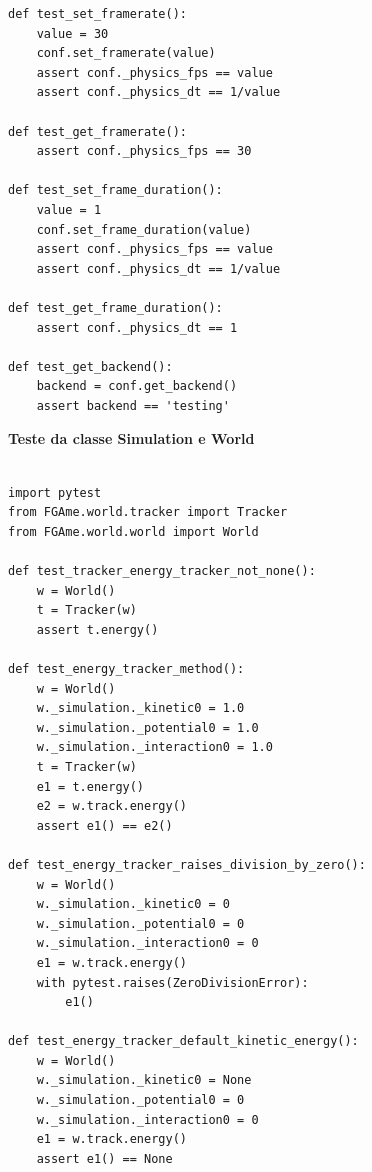 \begin{anexosenv}
\begin{lstlisting}
def test_set_framerate():
    value = 30
    conf.set_framerate(value)
    assert conf._physics_fps == value
    assert conf._physics_dt == 1/value

def test_get_framerate():
    assert conf._physics_fps == 30

def test_set_frame_duration():
    value = 1
    conf.set_frame_duration(value)
    assert conf._physics_fps == value
    assert conf._physics_dt == 1/value

def test_get_frame_duration():
    assert conf._physics_dt == 1

def test_get_backend():
    backend = conf.get_backend()
    assert backend == 'testing'
\end{lstlisting}



{\LARGE \textbf{Teste da classe Simulation e World}}

\begin{lstlisting}

import pytest
from FGAme.world.tracker import Tracker
from FGAme.world.world import World

def test_tracker_energy_tracker_not_none():
    w = World()
    t = Tracker(w)
    assert t.energy()

def test_energy_tracker_method():
    w = World()
    w._simulation._kinetic0 = 1.0
    w._simulation._potential0 = 1.0
    w._simulation._interaction0 = 1.0
    t = Tracker(w)
    e1 = t.energy()
    e2 = w.track.energy()
    assert e1() == e2()

def test_energy_tracker_raises_division_by_zero():
    w = World()
    w._simulation._kinetic0 = 0
    w._simulation._potential0 = 0
    w._simulation._interaction0 = 0
    e1 = w.track.energy()
    with pytest.raises(ZeroDivisionError):
        e1()

def test_energy_tracker_default_kinetic_energy():
    w = World()
    w._simulation._kinetic0 = None
    w._simulation._potential0 = 0
    w._simulation._interaction0 = 0
    e1 = w.track.energy()
    assert e1() == None
\end{lstlisting}

\end{anexosenv}



\pagestyle{empty}

